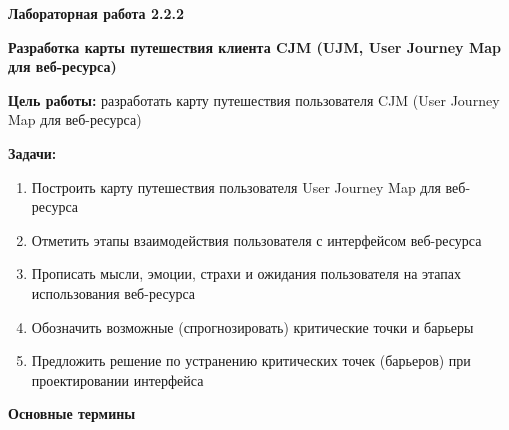 
\graphicspath{ {2.2.2/models/} }

\pagestyle{fancy}
\fancyhead{}
\renewcommand{\headrulewidth}{0pt}


\begin{center}
    \textbf{Лабораторная работа 2.2.2}

    \textbf{Разработка карты путешествия клиента CJM (UJM, User Journey Map для веб-ресурса)}
\end{center}

\textbf{Цель работы:} разработать карту путешествия пользователя CJM (User Journey Map для веб-ресурса)
\bigskip

\textbf{Задачи:}

\begin{enumerate}
    \item Построить карту путешествия пользователя User Journey Map для веб-ресурса
    \item Отметить этапы взаимодействия пользователя с интерфейсом веб-ресурса
    \item Прописать мысли, эмоции, страхи и ожидания пользователя на этапах использования веб-ресурса
    \item Обозначить возможные (спрогнозировать) критические точки и барьеры
    \item Предложить решение по устранению критических точек (барьеров) при проектировании интерфейса
\end{enumerate}
\bigskip

\textbf{Основные термины}

